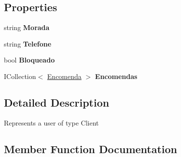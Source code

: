 \subsection*{Properties}
\begin{DoxyCompactItemize}
\item 
\mbox{\label{classmvc_j_j_m_s_1_1_models_1_1_cliente_a6bf7993bd0beaa8c680b83f8e725f903}} 
string {\bfseries Morada}
\item 
\mbox{\label{classmvc_j_j_m_s_1_1_models_1_1_cliente_a0b2c56229883d355575e444426ac3fbc}} 
string {\bfseries Telefone}
\item 
\mbox{\label{classmvc_j_j_m_s_1_1_models_1_1_cliente_a2017f6f64f03dd51c61bfcc7c40a7eb8}} 
bool {\bfseries Bloqueado}
\item 
\mbox{\label{classmvc_j_j_m_s_1_1_models_1_1_cliente_a1424f8c7942aee89e4b1b91919c6affc}} 
I\+Collection$<$ \mbox{\hyperlink{classmvc_j_j_m_s_1_1_models_1_1_encomenda}{Encomenda}} $>$ {\bfseries Encomendas}
\end{DoxyCompactItemize}


\subsection{Detailed Description}
Represents a user of type Client 



\subsection{Member Function Documentation}
\mbox{\label{classmvc_j_j_m_s_1_1_models_1_1_cliente_ae2c56c8d9c14db342234852e07873147}} 
